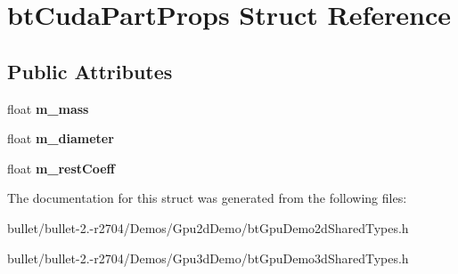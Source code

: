 \hypertarget{structbt_cuda_part_props}{\section{bt\+Cuda\+Part\+Props Struct Reference}
\label{structbt_cuda_part_props}
}
\subsection*{Public Attributes}
\begin{DoxyCompactItemize}
\item 
\hypertarget{structbt_cuda_part_props_a4e44dcc7b501dfdb5189b39a9cf58108}{float {\bfseries m\+\_\+mass}}\label{structbt_cuda_part_props_a4e44dcc7b501dfdb5189b39a9cf58108}

\item 
\hypertarget{structbt_cuda_part_props_ae53369da1ee066113ce3a32e0b0d9c1d}{float {\bfseries m\+\_\+diameter}}\label{structbt_cuda_part_props_ae53369da1ee066113ce3a32e0b0d9c1d}

\item 
\hypertarget{structbt_cuda_part_props_a37c271f5a8a46b4c48dfd29cc29ae797}{float {\bfseries m\+\_\+rest\+Coeff}}\label{structbt_cuda_part_props_a37c271f5a8a46b4c48dfd29cc29ae797}

\end{DoxyCompactItemize}


The documentation for this struct was generated from the following files\+:\begin{DoxyCompactItemize}
\item 
bullet/bullet-\/2.-\/r2704/\+Demos/\+Gpu2d\+Demo/bt\+Gpu\+Demo2d\+Shared\+Types.\+h\item 
bullet/bullet-\/2.-\/r2704/\+Demos/\+Gpu3d\+Demo/bt\+Gpu\+Demo3d\+Shared\+Types.\+h\end{DoxyCompactItemize}
